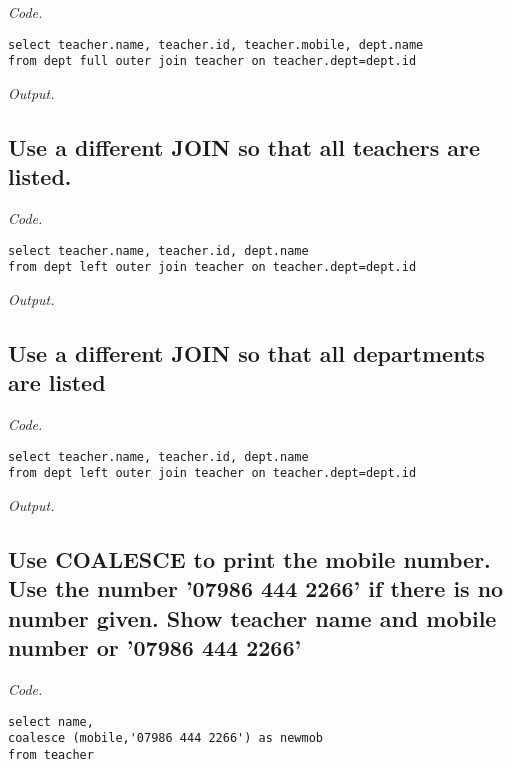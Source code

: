 \documentclass[12pt]{article}
\begin{document}
\textit{Code.}

\begin{lstlisting}[showstringspaces=false]
select teacher.name, teacher.id, teacher.mobile, dept.name 
from dept full outer join teacher on teacher.dept=dept.id
\end{lstlisting}

\textit{Output.}\\

\subsection{Use a different JOIN so that all teachers are listed.}

\textit{Code.}

\begin{lstlisting}[showstringspaces=false]
select teacher.name, teacher.id, dept.name 
from dept left outer join teacher on teacher.dept=dept.id
\end{lstlisting}

\textit{Output.}\\

\subsection{Use a different JOIN so that all departments are listed}

\textit{Code.}

\begin{lstlisting}[showstringspaces=false]
select teacher.name, teacher.id, dept.name 
from dept left outer join teacher on teacher.dept=dept.id
\end{lstlisting}

\textit{Output.}\\

\subsection{Use COALESCE to print the mobile number. Use the number '07986 444 2266' if there is no number given. Show teacher name and mobile number or '07986 444 2266'}

\textit{Code.}

\begin{lstlisting}[showstringspaces=false]
select name,
coalesce (mobile,'07986 444 2266') as newmob
from teacher
\end{lstlisting}
\end{document}
